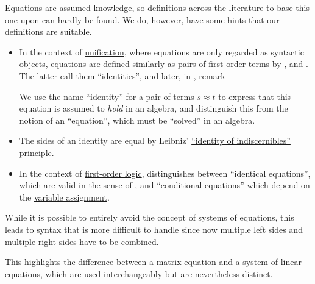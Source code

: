 \begin{comments}
  \item Equations are \hyperref[con:assumed_knowledge]{assumed knowledge}, so definitions across the literature to base this one upon can hardly be found. We do, however, have some hints that our definitions are suitable.

  \begin{itemize}
    \item In the context of \hyperref[con:unification]{unification}, where equations are only regarded as syntactic objects, equations are defined similarly as pairs of first-order terms by ,  and . The latter call them \enquote{identities}, and later, in , remark
    \begin{displayquote}
      We use the name \enquote{identity} for a pair of terms \( s \approx t \) to express that this equation is assumed to \textit{hold} in an algebra, and distinguish this from the notion of an \enquote{equation}, which must be \enquote{solved} in an algebra.
    \end{displayquote}

    \item The sides of an identity are equal by Leibniz' \hyperref[rem:identity_of_indiscernibles]{\enquote{identity of indiscernibles}} principle.

    \item In the context of \hyperref[def:nth_order_logic]{first-order logic},  distinguishes between \enquote{identical equations}, which are valid in the sense of , and \enquote{conditional equations} which depend on the \hyperref[def:first_order_valuation/variable_assignment]{variable assignment}.
  \end{itemize}

  \item While it is possible to entirely avoid the concept of systems of equations, this leads to syntax that is more difficult to handle since now multiple left sides and multiple right sides have to be combined.

  This highlights the difference between a matrix equation and a system of linear equations, which are used interchangeably but are nevertheless distinct.
\end{comments}

